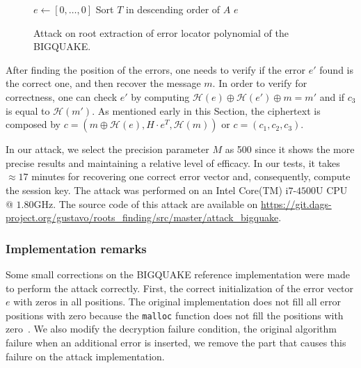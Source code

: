 \begin{figure}[ht]
\centering
\begin{algorithm}[H]
 $e \gets [0,\ldots,0]$\;
Sort $T$ in descending order of $A$\;
\Return $e$\;
 \caption{Attack on root extraction of error locator polynomial of the BIGQUAKE.}
  \label{alg:attack:1}
\end{algorithm}
\end{figure}

After finding the position of the errors, one needs to verify if the error $e'$ found is the correct one, and then recover the message $m$. In order to verify for correctness, one can check $e'$ by computing $\mathcal{H}(e) \oplus \mathcal{H}(e') \oplus m = m'$ and if $c_3$ is equal to $\mathcal{H}(m')$. As mentioned early in this Section, the ciphertext is composed by $c = (m\oplus\mathcal{H}(e), H\cdot e^T, \mathcal{H}(m))$ or $c = (c_1, c_2, c_3)$.

In our attack, we select the precision parameter $M$ as 500 since it shows the more precise results and maintaining a relative level of efficacy.  In our tests, it takes $\approx17$ minutes for recovering one correct error vector and, consequently, compute the session key. The attack was performed on an Intel\textsuperscript{\tiny\textregistered} Core(TM) i$7$-$4500$U CPU @ $1.80$GHz. The source code of this attack are available on \url{https://git.dags-project.org/gustavo/roots_finding/src/master/attack_bigquake}.

\subsubsection{Implementation remarks}
Some small corrections on the BIGQUAKE reference implementation were made to perform the attack correctly. First, the correct initialization of the error vector $e$ with zeros in all positions. The original implementation does not fill all error positions with zero because the \texttt{malloc} function does not fill the positions with zero~\cite{c++2014iso}. We also modify the decryption failure condition, the original algorithm failure when an additional error is inserted, we remove the part that causes this failure on the attack implementation.

